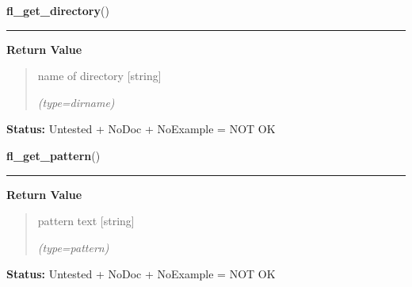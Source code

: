     \label{xformslib:library:fl_get_directory}

    \vspace{0.5ex}

\hspace{.8\funcindent}\begin{boxedminipage}{\funcwidth}

    \raggedright \textbf{fl\_get\_directory}()

    \vspace{-1.5ex}

    \rule{\textwidth}{0.5\fboxrule}
\setlength{\parskip}{2ex}
\setlength{\parskip}{1ex}
      \textbf{Return Value}
    \vspace{-1ex}

      \begin{quote}
      name of directory [string]

      {\it (type=dirname)}

      \end{quote}

\textbf{Status:} Untested + NoDoc + NoExample = NOT OK



    \end{boxedminipage}

    \label{xformslib:library:fl_get_pattern}

    \vspace{0.5ex}

\hspace{.8\funcindent}\begin{boxedminipage}{\funcwidth}

    \raggedright \textbf{fl\_get\_pattern}()

    \vspace{-1.5ex}

    \rule{\textwidth}{0.5\fboxrule}
\setlength{\parskip}{2ex}
\setlength{\parskip}{1ex}
      \textbf{Return Value}
    \vspace{-1ex}

      \begin{quote}
      pattern text [string]

      {\it (type=pattern)}

      \end{quote}

\textbf{Status:} Untested + NoDoc + NoExample = NOT OK



    \end{boxedminipage}

